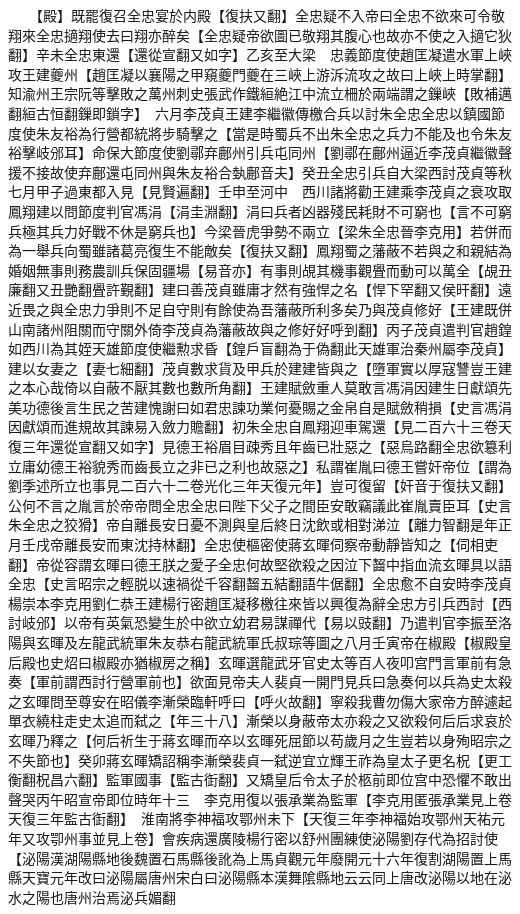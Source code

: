 　　【殿】既罷復召全忠宴於内殿【復扶又翻】全忠疑不入帝曰全忠不欲來可令敬翔來全忠擿翔使去曰翔亦醉矣【全忠疑帝欲圖已敬翔其腹心也故亦不使之入擿它狄翻】辛未全忠東還【還從宣翻又如字】乙亥至大梁　忠義節度使趙匡凝遣水軍上峽攻王建夔州【趙匡凝以襄陽之甲窺夔門夔在三峽上游泝流攻之故曰上峽上時掌翻】知渝州王宗阮等擊敗之萬州刺史張武作鐵絙絶江中流立柵於兩端謂之鏁峽【敗補邁翻絙古恒翻鏁即鎖字】　六月李茂貞王建李繼徽傳檄合兵以討朱全忠全忠以鎮國節度使朱友裕為行營都統將步騎擊之【當是時蜀兵不出朱全忠之兵力不能及也令朱友裕擊岐邠耳】命保大節度使劉鄩弃鄜州引兵屯同州【劉鄩在鄜州逼近李茂貞繼徽聲援不接故使弃鄜還屯同州與朱友裕合埶鄜音夫】癸丑全忠引兵自大梁西討茂貞等秋七月甲子過東都入見【見賢遍翻】壬申至河中　西川諸將勸王建乘李茂貞之衰攻取鳳翔建以問節度判官馮涓【涓圭淵翻】涓曰兵者凶器殘民耗財不可窮也【言不可窮兵極其兵力好戰不休是窮兵也】今梁晉虎爭勢不兩立【梁朱全忠晉李克用】若併而為一舉兵向蜀雖諸葛亮復生不能敵矣【復扶又翻】鳳翔蜀之藩蔽不若與之和親結為婚姻無事則務農訓兵保固疆場【易音亦】有事則覘其機事觀舋而動可以萬全【覘丑廉翻又丑艷翻舋許覲翻】建曰善茂貞雖庸才然有強悍之名【悍下罕翻又侯旰翻】遠近畏之與全忠力爭則不足自守則有餘使為吾藩蔽所利多矣乃與茂貞修好【王建既併山南諸州阻關而守關外倚李茂貞為藩蔽故與之修好好呼到翻】丙子茂貞遣判官趙鍠如西川為其姪天雄節度使繼勲求昏【鍠戶盲翻為于偽翻此天雄軍治秦州屬李茂貞】建以女妻之【妻七細翻】茂貞數求貨及甲兵於建建皆與之【墮軍實以厚寇讐豈王建之本心哉倚以自蔽不厭其數也數所角翻】王建賦斂重人莫敢言馮涓因建生日獻頌先美功德後言生民之苦建愧謝曰如君忠諫功業何憂賜之金帛自是賦斂稍損【史言馮涓因獻頌而進規故其諫易入斂力贍翻】初朱全忠自鳳翔迎車駕還【見二百六十三卷天復三年還從宣翻又如字】見德王裕眉目疎秀且年齒已壯惡之【惡烏路翻全忠欲簒利立庸幼德王裕貌秀而齒長立之非已之利也故惡之】私謂崔胤曰德王嘗奸帝位【謂為劉季述所立也事見二百六十二卷光化三年天復元年】豈可復留【奸音于復扶又翻】公何不言之胤言於帝帝問全忠全忠曰陛下父子之間臣安敢竊議此崔胤賣臣耳【史言朱全忠之狡猾】帝自離長安日憂不測與皇后終日沈飲或相對涕泣【離力智翻是年正月壬戌帝離長安而東沈持林翻】全忠使樞密使蔣玄暉伺察帝動靜皆知之【伺相吏翻】帝從容謂玄暉曰德王朕之愛子全忠何故堅欲殺之因泣下齧中指血流玄暉具以語全忠【史言昭宗之輕脱以速禍從千容翻齧五結翻語牛倨翻】全忠愈不自安時李茂貞楊崇本李克用劉仁恭王建楊行密趙匡凝移檄往來皆以興復為辭全忠方引兵西討【西討岐邠】以帝有英氣恐變生於中欲立幼君易謀禪代【易以豉翻】乃遣判官李振至洛陽與玄暉及左龍武統軍朱友恭右龍武統軍氏叔琮等圖之八月壬寅帝在椒殿【椒殿皇后殿也史炤曰椒殿亦猶椒房之稱】玄暉選龍武牙官史太等百人夜叩宫門言軍前有急奏【軍前謂西討行營軍前也】欲面見帝夫人裴貞一開門見兵曰急奏何以兵為史太殺之玄暉問至尊安在昭儀李漸榮臨軒呼曰【呼火故翻】寧殺我曹勿傷大家帝方醉遽起單衣繞柱走史太追而弑之【年三十八】漸榮以身蔽帝太亦殺之又欲殺何后后求哀於玄暉乃釋之【何后祈生于蔣玄暉而卒以玄暉死屈節以苟歲月之生豈若以身殉昭宗之不失節也】癸卯蔣玄暉矯詔稱李漸榮裴貞一弑逆宜立輝王祚為皇太子更名柷【更工衡翻柷昌六翻】監軍國事【監古衘翻】又矯皇后令太子於柩前即位宫中恐懼不敢出聲哭丙午昭宣帝即位時年十三　李克用復以張承業為監軍【李克用匿張承業見上卷天復三年監古衘翻】　淮南將李神福攻鄂州未下【天復三年李神福始攻鄂州天祐元年又攻卾州事並見上卷】會疾病還廣陵楊行密以舒州團練使泌陽劉存代為招討使【泌陽漢湖陽縣地後魏置石馬縣後訛為上馬貞觀元年廢開元十六年復割湖陽置上馬縣天寶元年改曰泌陽屬唐州宋白曰泌陽縣本漢舞隂縣地云云同上唐改泌陽以地在泌水之陽也唐州治焉泌兵媚翻